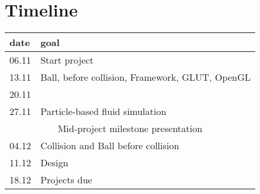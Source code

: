 \section*{Timeline}
\begin{tabular}{ll}
	\toprule
	date& goal\\
	\midrule
	06.11&Start project\\
	13.11&Ball, before collision, Framework, GLUT, OpenGL\\
	20.11&\\
	27.11&Particle-based fluid simulation\\
	\midrule
	\multicolumn{2}{c}{Mid-project milestone presentation}\\
	\midrule
	04.12&Collision and Ball before collision \\
	11.12&Design\\
	18.12&Projects due\\
	\bottomrule
\end{tabular}
